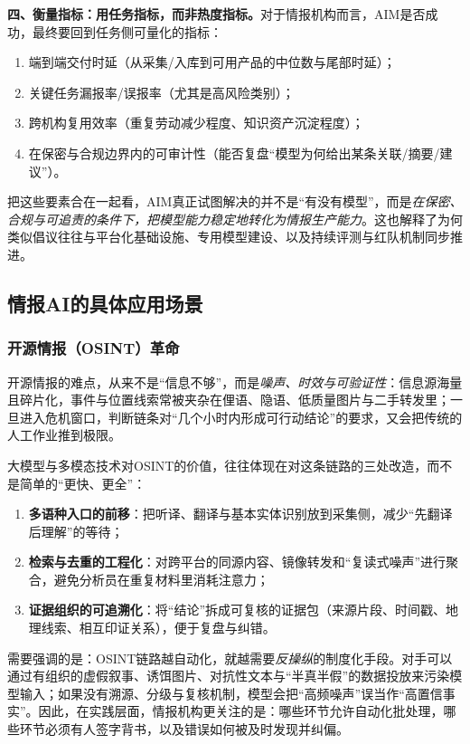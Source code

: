             {\bfseries 四、衡量指标：用任务指标，而非热度指标。}对于情报机构而言，AIM是否成功，最终要回到任务侧可量化的指标：
\begin{enumerate}[label=(\arabic*)]
    \item 端到端交付时延（从采集/入库到可用产品的中位数与尾部时延）；
    \item 关键任务漏报率/误报率（尤其是高风险类别）；
    \item 跨机构复用效率（重复劳动减少程度、知识资产沉淀程度）；
    \item 在保密与合规边界内的可审计性（能否复盘“模型为何给出某条关联/摘要/建议”）。
\end{enumerate}

把这些要素合在一起看，AIM真正试图解决的并不是“有没有模型”，而是\emph{在保密、合规与可追责的条件下，把模型能力稳定地转化为情报生产能力}。这也解释了为何类似倡议往往与平台化基础设施、专用模型建设、以及持续评测与红队机制同步推进。

\subsection{情报AI的具体应用场景}

\subsubsection{开源情报（OSINT）革命}

开源情报的难点，从来不是“信息不够”，而是\emph{噪声、时效与可验证性}：信息源海量且碎片化，事件与位置线索常被夹杂在俚语、隐语、低质量图片与二手转发里；一旦进入危机窗口，判断链条对“几个小时内形成可行动结论”的要求，又会把传统的人工作业推到极限。

大模型与多模态技术对OSINT的价值，往往体现在对这条链路的三处改造，而不是简单的“更快、更全”：
\begin{enumerate}[label=(\arabic*)]
    \item \textbf{多语种入口的前移}：把听译、翻译与基本实体识别放到采集侧，减少“先翻译后理解”的等待；
    \item \textbf{检索与去重的工程化}：对跨平台的同源内容、镜像转发和“复读式噪声”进行聚合，避免分析员在重复材料里消耗注意力；
    \item \textbf{证据组织的可追溯化}：将“结论”拆成可复核的证据包（来源片段、时间戳、地理线索、相互印证关系），便于复盘与纠错。
\end{enumerate}

需要强调的是：OSINT链路越自动化，就越需要\emph{反操纵}的制度化手段。对手可以通过有组织的虚假叙事、诱饵图片、对抗性文本与“半真半假”的数据投放来污染模型输入；如果没有溯源、分级与复核机制，模型会把“高频噪声”误当作“高置信事实”。因此，在实践层面，情报机构更关注的是：哪些环节允许自动化批处理，哪些环节必须有人签字背书，以及错误如何被及时发现并纠偏。

